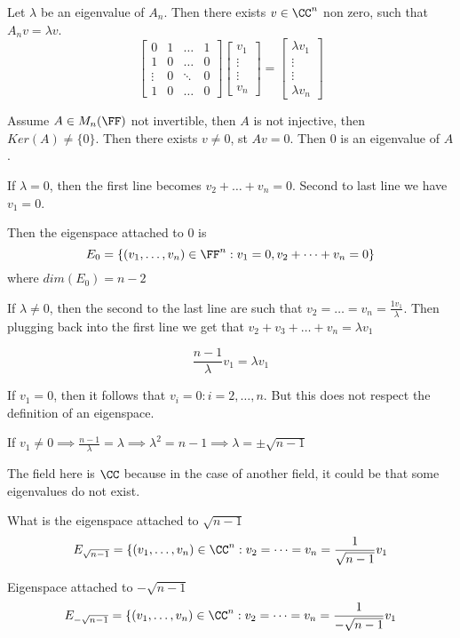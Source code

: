 \documentclass[11pt]{scrartcl}
\begin{document}
\begin{soln}
	Let $\lambda$ be an eigenvalue of $A_n$. Then there exists $v \in \CC^n$ non zero, such that $A_nv = \lambda v$.
	\[
	\begin{bmatrix}
	0 & 1 & \dots & 1\\
	1 & 0 & \dots & 0\\
	\vdots & 0 & \ddots & 0\\
	1 & 0 & \dots & 0
	\end{bmatrix}
	\begin{bmatrix}
	v_1\\
	\vdots\\
	\vdots\\
	v_n
	\end{bmatrix}
	= 
	\begin{bmatrix}
	\lambda v_1\\
	\vdots\\
	\vdots\\
	\lambda v_n
	\end{bmatrix}
	\]
	
	\begin{note*}
		Assume $A \in M_n(\FF)$ not invertible, then $A$ is not injective, then $Ker(A) \neq \{0\}$. Then there exists $v \neq 0$, st $Av = 0$. Then 0 is an eigenvalue of $A$.
	\end{note*}

	If $\lambda = 0$, then the first line becomes $v_2 + \dots + v_n = 0$. Second to last line we have $v_1 = 0$.
	
	Then the eigenspace attached to 0 is 
	\[
	E_0 = \{(v_1, \dots, v_n) \in \FF^n: v_1 = 0, v_2 + \dots + v_n =0\}
	\]
	where $dim(E_0) = n-2$
	
	If $\lambda \neq 0$, then the second to the last line are such that $v_2 = \dots = v_n = \frac{1v_1}{\lambda}$. Then plugging back into the first line we get that $v_2 + v_3 + \dots + v_n = \lambda v_1$
	
	\[
	\frac{n-1}{\lambda} v_1 = \lambda v_1
	\]
	
	If $v_1 = 0$, then it follows that $v_i = 0: i= 2, \dots, n$. But this does not respect the definition of an eigenspace.
	
	If $v_1 \neq 0 \implies \frac{n-1}{\lambda} = \lambda \implies \lambda^2 = n-1 \implies \lambda = \pm \sqrt{n-1}$
	\begin{note*}
	The field here is $\CC$ because in the case of another field, it could be that some eigenvalues do not exist.
	\end{note*}

	What is the eigenspace attached to $\sqrt{n-1}$
	\[
	E_{\sqrt{n-1}} = \{(v_1, \dots, v_n)\in \CC^n : v_2 = \dots = v_n = \frac{1}{\sqrt{n-1}} v_1
	\]
	
	Eigenspace attached to $-\sqrt{n-1}$
	\[
	E_{-\sqrt{n-1}} = \{(v_1, \dots, v_n)\in \CC^n : v_2 = \dots = v_n = \frac{1}{-\sqrt{n-1}} v_1
	\]
\end{soln}
\end{document}
